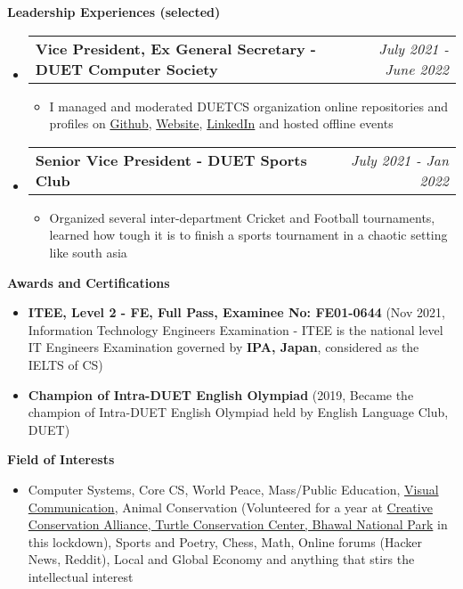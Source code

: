 \documentclass[legalpaper,10pt]{article}
\makeatletter
\newcommand{\resheading}[1]{{\large \colorbox{mygrey}{\begin{minipage}{\textwidth}{\textbf{#1 \vphantom{p\^{E}}}}\end{minipage}}}}
\newcommand{\ressubheading}[4]{
	\begin{tabular*}{7.1in}{l@{\extracolsep{\fill}}r}
		\textbf{#1} & \textit{#4} \\
	\end{tabular*}\vspace{-6pt}}
\makeatother
\begin{document}
	\vspace{0.20in}
	
	\resheading{Leadership Experiences (selected)}
	\begin{itemize}
		\item \ressubheading{Vice President, Ex General Secretary - DUET Computer Society}{}{}{July 2021 - June 2022}
		\begin{itemize}
		    \item I managed and moderated DUETCS organization online repositories and profiles on \href{https://github.com/duetcs}{Github}, \href{https://duetcs.github.io}{Website}, \href{https://www.linkedin.com/company/duet-computer-society}{LinkedIn} and hosted offline events
		\end{itemize}
		
		\item \ressubheading{Senior Vice President - DUET Sports Club}{}{}{July 2021 - Jan 2022}
		\begin{itemize}
		    \item Organized several inter-department Cricket and Football tournaments, learned how tough it is to finish a sports tournament in a chaotic setting like south asia
		\end{itemize}
		
	\end{itemize}

	\vspace{0.20in}
	
	\resheading{Awards and Certifications}
	\begin{itemize}
	
		\item \textbf{ITEE, Level 2 - FE, Full Pass, Examinee No: FE01-0644} (Nov 2021,  Information Technology Engineers Examination - ITEE is the national level IT Engineers Examination governed by \textbf{IPA, Japan}, considered as the IELTS of CS) 
		
		\item \textbf{Champion of Intra-DUET English Olympiad} (2019, Became the champion of Intra-DUET English Olympiad held by English Language Club, DUET)

	\end{itemize}

	\vspace{0.20in}
	
	\resheading{Field of Interests}
		\begin{itemize}
			\item Computer Systems, Core CS,  World Peace, Mass/Public Education, \href{https://www.instagram.com/obepari/}{Visual Communication}, Animal Conservation (Volunteered for a year at \url{} \href{https://www.instagram.com/creativeconservationalliance/}{Creative Conservation Alliance, Turtle Conservation Center, Bhawal National Park} in this lockdown), Sports and Poetry, Chess, Math, Online forums (Hacker News, Reddit), Local and Global Economy and anything that stirs the intellectual interest
		\end{itemize}
\end{document}
